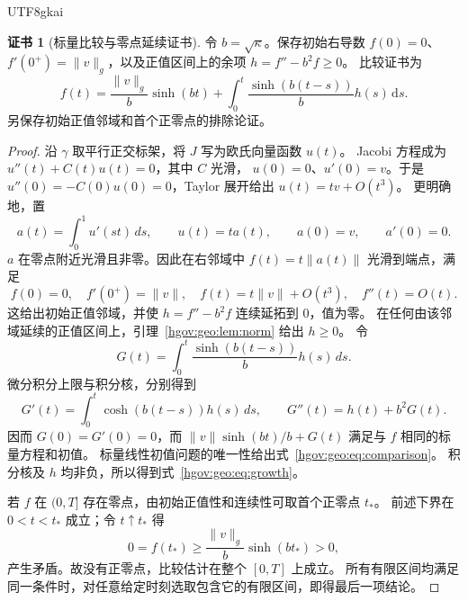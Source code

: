 \documentclass[12pt,a4paper,openany,notitlepage]{report}
\theoremstyle{plain}
\theoremstyle{definition}
\newtheorem*{certificate}{证书}
\theoremstyle{remark}
\begin{document}
\begin{CJK*}{UTF8}{gkai}
\begin{certificate}[标量比较与零点延续证书]
令 $b=\sqrt\kappa$。保存初始右导数
$f(0)=0$、$f'(0^+)=\lVert v\rVert_g$，以及正值区间上的余项
$h=f''-b^2f\ge0$。
比较证书为
\begin{equation}
\label{hgov:geo:eq:comparison}
f(t)=\frac{\lVert v\rVert_g}{b}\sinh(bt)
+\int_0^t\frac{\sinh(b(t-s))}{b}h(s)\,\mathrm ds.
\end{equation}
另保存初始正值邻域和首个正零点的排除论证。
\end{certificate}

\begin{proof}
沿 $\gamma$ 取平行正交标架，将 $J$ 写为欧氏向量函数 $u(t)$。
Jacobi 方程成为 $u''(t)+C(t)u(t)=0$，其中 $C$ 光滑，
$u(0)=0$、$u'(0)=v$。于是 $u''(0)=-C(0)u(0)=0$，Taylor 展开给出
$u(t)=tv+O(t^3)$。
更明确地，置
\[
a(t)=\int_0^1u'(st)\,ds,
\qquad u(t)=t a(t),\qquad a(0)=v,\qquad a'(0)=0.
\]
$a$ 在零点附近光滑且非零。因此在右邻域中
$f(t)=t\lVert a(t)\rVert$ 光滑到端点，满足
\[
f(0)=0,\quad f'(0^+)=\lVert v\rVert,
\quad f(t)=t\lVert v\rVert+O(t^3),\quad f''(t)=O(t).
\]
这给出初始正值邻域，并使 $h=f''-b^2f$ 连续延拓到 $0$，值为零。
在任何由该邻域延续的正值区间上，引理~\ref{hgov:geo:lem:norm} 给出 $h\ge0$。
令
\[
G(t)=\int_0^t\frac{\sinh(b(t-s))}{b}h(s)\,ds.
\]
微分积分上限与积分核，分别得到
\[
G'(t)=\int_0^t\cosh(b(t-s))h(s)\,ds,
\qquad
G''(t)=h(t)+b^2G(t).
\]
因而 $G(0)=G'(0)=0$，而
$\lVert v\rVert\sinh(bt)/b+G(t)$ 满足与 $f$ 相同的标量方程和初值。
标量线性初值问题的唯一性给出式~\eqref{hgov:geo:eq:comparison}。
积分核及 $h$ 均非负，所以得到式~\eqref{hgov:geo:eq:growth}。

若 $f$ 在 $(0,T]$ 存在零点，由初始正值性和连续性可取首个正零点 $t_*$。
前述下界在 $0<t<t_*$ 成立；令 $t\uparrow t_*$ 得
\[
0=f(t_*)\ge\frac{\lVert v\rVert_g}{b}\sinh(bt_*)>0,
\]
产生矛盾。故没有正零点，比较估计在整个 $[0,T]$ 上成立。
所有有限区间均满足同一条件时，对任意给定时刻选取包含它的有限区间，即得最后一项结论。
\end{proof}


\end{CJK*}
\end{document}
